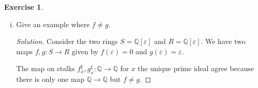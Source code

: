 \documentclass{article}
\renewcommand{\qedsymbol}{\raisebox{-0.5cm}{}}
\newcommand{\Q}{\mathbb{Q}}
\newcommand{\primeid}{\mathfrak{p}}
\newenvironment{solution}{\begin{proof}[Solution]\renewcommand\qedsymbol{}}{\end{proof}}
\theoremstyle{definition}
\newtheorem{question}{Exercise}
\begin{document}
\begin{question}
\begin{enumerate}[(i)]
\begin{proof}
                  Now for the non-affine case. We show that for each
                  \(\primeid\in K\) there is an open neighbourhood such that
                  \(f\) and \(g\) agree on this neighbourhood. This immediately
                  gives that \(f\) and \(g\) agree on the entirety of \(K\).

                  Take \(\primeid\in K\). Then \(f(\primeid)\) has an affine
                  open neighbourhood \(U\subseteq X\) which naturally has the
                  structure of an open subscheme of \(X\). The inverse image
                  \(V=f^{-1}[X]\) is then an open subscheme of \(K\) with
                  \(\primeid\in V\) and restrictions \(f|_{V},g|_{V}:V\to U\).
                  Now there is also an affine neighbourhood \(W\subseteq V\) of
                  \(\primeid\). Taking \(f|_{W},g|_{W}:W\to U\) now two
                  morphisms between affine schemes, we see immediately that
                  \(f(\primeid)\equiv g(\primeid)\) and \(W\) is reduced because
                  it is an open subscheme of a reduced scheme. The lemma then
                  gives that \(f|_{W}=g|_{W}\).

                  This means that \(f,g\) agree everywhere and therefore that
                  \(f=g\).
              \end{proof}

        \item Give an example where \(f\neq g\).

              \begin{solution}
                  Consider the two rings \(S=\Q[\varepsilon]\) and
                  \(R=\Q[\varepsilon]\). We have two maps \(f,g:S\to R\) given
                  by \(f(\varepsilon)=0\) and \(g(\varepsilon)=\varepsilon\).

                  The map on stalks \(f^{\sharp}_{x},g^{\sharp}_{x}:\Q\to\Q\)
                  for \(x\) the unique prime ideal agree because there is only
                  one map \(\Q\to\Q\) but \(f\neq g\).
              \end{solution}
    \end{enumerate}
\end{question}
\end{document}

